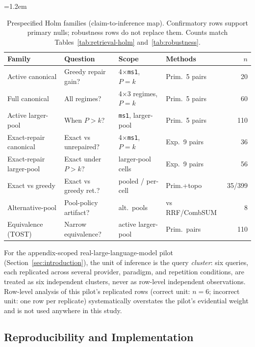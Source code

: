 \documentclass[pdflatex,sn-basic,Numbered]{sn-jnl}
\newcommand{\sncstable}{%
  \footnotesize
  \renewcommand{\arraystretch}{1.28}%
  \setlength{\tabcolsep}{3.8pt}%
  \tolerance=2000%
  \emergencystretch=1.2em%
  \hyphenpenalty=200\exhyphenpenalty=200\relax
}
\begin{document}
\begin{table}[t]
  \caption{Prespecified Holm families (claim-to-inference map).
    Confirmatory rows support primary nulls; robustness rows do not
    replace them. Counts match Tables~\ref{tab:retrieval-holm}
    and~\ref{tab:robustness}.}
  \label{tab:holm-families}
  \sncstable
  \begin{tabularx}{\linewidth}{@{}lYYY r@{}}
    \toprule
    Family & Question & Scope & Methods & $n$ \\
    \midrule
    Active canonical & Greedy repair gain? & 4$\times$\texttt{ms1}, $P{=}k$ & Prim.\ 5 pairs & 20 \\
    \addlinespace
    Full canonical & All regimes? & 4$\times$3 regimes, $P{=}k$ & Prim.\ 5 pairs & 60 \\
    \addlinespace
    Active larger-pool & When $P{>}k$? & \texttt{ms1}, larger-pool & Prim.\ 5 pairs & 110 \\
    \addlinespace
    Exact-repair canonical & Exact vs unrepaired? & 4$\times$\texttt{ms1}, $P{=}k$ & Exp.\ 9 pairs & 36 \\
    \addlinespace
    Exact-repair larger-pool & Exact under $P{>}k$? & larger-pool cells & Exp.\ 9 pairs & 56 \\
    \addlinespace
    Exact vs greedy & Exact vs greedy ret.? & pooled / per-cell & Prim.+topo & 35/399 \\
    \addlinespace
    Alternative-pool & Pool-policy artifact? & alt.\ pools & vs RRF/CombSUM & 8 \\
    \addlinespace
    Equivalence (TOST) & Narrow equivalence? & active larger-pool & Prim.\ pairs & 110 \\
    \bottomrule
  \end{tabularx}
\end{table}

For the appendix-scoped real-large-language-model pilot
(Section~\ref{sec:introduction}), the unit of inference is the query
\emph{cluster}: six queries, each replicated across several provider,
paradigm, and repetition conditions, are treated as six independent
clusters, never as row-level independent observations. Row-level analysis
of this pilot's replicated rows (correct unit: $n=6$; incorrect unit:
one row per replicate) systematically overstates the pilot's evidential
weight and is not used anywhere in this study.

\subsection{Reproducibility and Implementation}
\label{sec:reproducibility}
\end{document}

